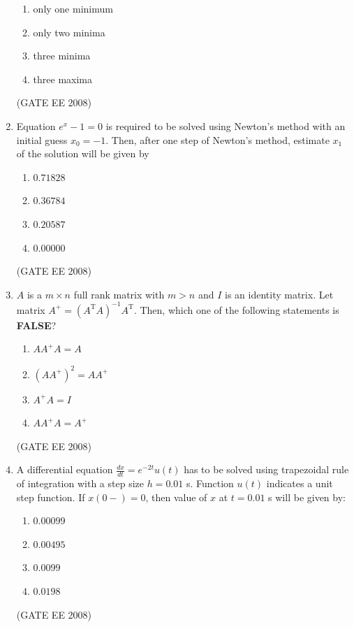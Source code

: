 \documentclass[journal,12pt,onecolumn]{IEEEtran}
\theoremstyle{remark}
\begin{document}
\begin{enumerate}[start=1, label=Q.\arabic*]
\begin{enumerate}[label=(\Alph*)]
    \item only one minimum
    \item only two minima
    \item three minima
    \item three maxima
\end{enumerate}
\hfill (GATE EE 2008)



\item Equation $e^x - 1 = 0$ is required to be solved using Newton's method with an initial guess $x_0 = -1$. Then, after one step of Newton's method, estimate $x_1$ of the solution will be given by

\begin{multicols}{4}
\begin{enumerate}[label=(\Alph*)]
    \item $0.71828$
    \item $0.36784$
    \item $0.20587$
    \item $0.00000$
\end{enumerate}
\end{multicols}
\hfill (GATE EE 2008)

\item $A$ is a $m \times n$ full rank matrix with $m>n$ and $I$ is an identity matrix. Let matrix $A^{+}=(A^{\text{T}}A)^{-1}A^{\text{T}}$. Then, which one of the following statements is \textbf{FALSE}?

\begin{multicols}{2}
\begin{enumerate}[label=(\Alph*)]
    \item $AA^{+}A = A$
    \item $(AA^{+})^2 = AA^{+}$
    \item $A^{+}A = I$
    \item $A A^{+}A = A^{+}$
\end{enumerate}
\end{multicols}
\hfill (GATE EE 2008)



\item A differential equation $\frac{dx}{dt} = e^{-2t}u(t)$ has to be solved using trapezoidal rule of integration with a step size $h=0.01$ s. Function $u(t)$ indicates a unit step function. If $x(0-) = 0$, then value of $x$ at $t=0.01$ s will be given by:

\begin{multicols}{4}
\begin{enumerate}[label=(\Alph*)]
    \item $0.00099$
    \item $0.00495$
    \item $0.0099$
    \item $0.0198$
\end{enumerate}
\end{multicols}
\hfill (GATE EE 2008)


\end{enumerate}
\end{document}
